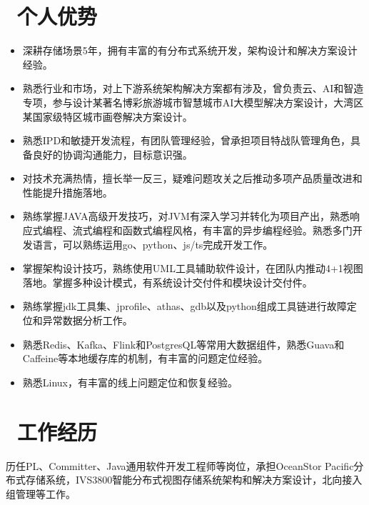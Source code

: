 \documentclass{resume}
\begin{document}




\section{\faStar\ 个人优势}
\begin{onehalfspacing}
  \begin{itemize}
    \item 深耕存储场景5年，拥有丰富的有分布式系统开发，架构设计和解决方案设计经验。
    \item 熟悉行业和市场，对上下游系统架构解决方案都有涉及，曾负责云、AI和智造专项，参与设计某著名博彩旅游城市智慧城市AI大模型解决方案设计，大湾区某国家级特区城市画卷解决方案设计。
    \item 熟悉IPD和敏捷开发流程，有团队管理经验，曾承担项目特战队管理角色，具备良好的协调沟通能力，目标意识强。
    \item 对技术充满热情，擅长举一反三，疑难问题攻关之后推动多项产品质量改进和性能提升措施落地。
    \item 熟练掌握JAVA高级开发技巧，对JVM有深入学习并转化为项目产出，熟悉响应式编程、流式编程和函数式编程风格，有丰富的异步编程经验。熟悉多门开发语言，可以熟练运用go、python、js/ts完成开发工作。
    \item 掌握架构设计技巧，熟练使用UML工具辅助软件设计，在团队内推动4+1视图落地。掌握多种设计模式，有系统设计交付件和模块设计交付件。
    \item 熟练掌握jdk工具集、jprofile、athas、gdb以及python组成工具链进行故障定位和异常数据分析工作。
    \item 熟悉Redis、Kafka、Flink和PostgresQL等常用大数据组件，熟悉Guava和Caffeine等本地缓存库的机制，有丰富的问题定位经验。
    \item 熟悉Linux，有丰富的线上问题定位和恢复经验。
  \end{itemize}
\end{onehalfspacing}

\section{\faUsers\ 工作经历}
历任PL、Committer、Java通用软件开发工程师等岗位，承担OceanStor Pacific分布式存储系统，IVS3800智能分布式视图存储系统架构和解决方案设计，北向接入组管理等工作。
\end{document}
